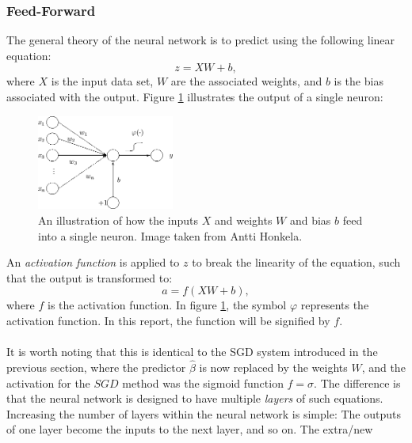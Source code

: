         \subsubsection{Feed-Forward}
            The general theory of the neural network is to predict using the following linear equation:
            \begin{equation}\label{eq:z1}
                z = X W + b,
            \end{equation}
            where $X$ is the input data set, $W$ are the associated weights, and $b$ is the bias associated with the output. Figure \ref{fig:MLP_conc} illustrates the output of a single neuron:
            \begin{figure}[H]
                \centering
                \includegraphics[width=0.4\textwidth]{figures/MLP.png}
                \caption{An illustration of how the inputs $X$ and weights $W$ and bias $b$ feed into a single neuron. Image taken from Antti Honkela.}
                \label{fig:MLP_conc}
            \end{figure}
            An \textit{activation function} is applied to $z$ to break the linearity of the equation, such that the output is transformed to:
            \begin{equation}\label{eq:a1}
                a = f\left( X W + b \right),
            \end{equation}
            where $f$ is the activation function. In figure \ref{fig:MLP_conc}, the symbol $\varphi$ represents the activation function. In this report, the function will be signified by $f$.\\\\
            It is worth noting that this is identical to the SGD system introduced in the previous section, where the predictor $\hat{\beta}$ is now replaced by the weights $W$, and the activation for the $SGD$ method was the sigmoid function $f=\sigma$. The difference is that the neural network is designed to have multiple \textit{layers} of such equations. Increasing the number of layers within the neural network is simple: The outputs of one layer become the inputs to the next layer, and so on. The extra/new
